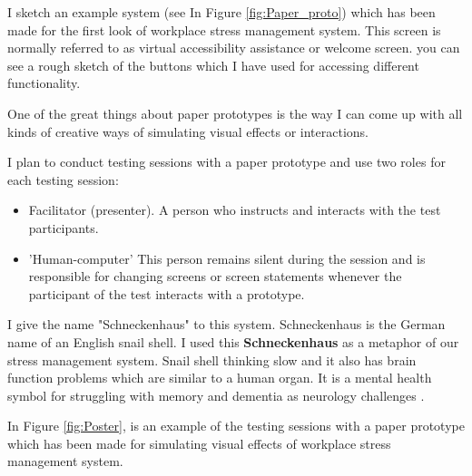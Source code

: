 I sketch an example system (see In Figure \ref{fig:Paper_proto})  which has been made for the first look of workplace stress management system. This screen is normally referred to as virtual accessibility assistance or welcome screen. you can see a rough sketch of the buttons which I have used for accessing different functionality. 

One of the great things about paper prototypes is the way I can come up with all kinds of creative ways of simulating visual effects or interactions.

I plan to conduct testing sessions with a paper prototype and use two roles for each testing session:
\begin{itemize}
    \item Facilitator (presenter). A person who instructs and interacts with the test participants.
    \item 'Human-computer' This person remains silent during the session and is responsible for changing screens or screen statements whenever the participant of the test interacts with a prototype.
\end{itemize}

I give the name "Schneckenhaus" to this system. Schneckenhaus is the German name of an English snail shell. I used this \textbf{Schneckenhaus} as a metaphor of our stress management system. Snail shell thinking slow and it also has brain function problems which are similar to a human organ. It is a mental health symbol for struggling with memory and dementia as neurology challenges \citep{Zachos2018TraumaResearch}.

In Figure \ref{fig:Poster}, is an example of the testing sessions with a paper prototype which has been made for simulating visual effects of workplace stress management system.

